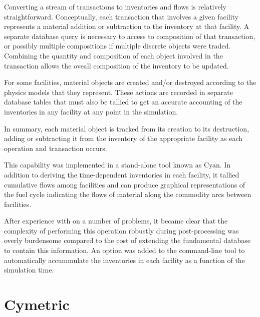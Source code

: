 Converting a stream of transactions to inventories and flows is relatively
straightforward.  Conceptually, each transaction that involves a given
facility represents a material addition or subtraction to the inventory at
that facility.  A separate database query is necessary to access to
composition of that transaction, or possibly multiple compositions if multiple
discrete objects were traded.  Combining the quantity and composition of each
object involved in the transaction allows the oveall composition of the
inventory to be updated.

For some facilities, material objects are created and/or destroyed according
to the physics models that they represent.  These actions are recorded in
separate database tables that must also be tallied to get an accurate
accounting of the inventories in any facility at any point in the simulation.

In summary, each material object is tracked from its creation to its
destruction, adding or subtracting it from the inventory of the appropriate
facility as each operation and transaction occurs.

This capability was implemented in a stand-alone tool known as Cyan.  In
addition to deriving the time-dependent inventories in each facility, it
tallied cumulative flows among facilities and can produce graphical
representations of the fuel cycle indicating the flows of material along the
commodity arcs between facilities.

After experience with \Cyclus on a number of problems, it became clear that
the complexity of performing this operation robustly during post-processing
was overly burdensome compared to the cost of extending the fundamental
\Cyclus database to contain this information.  An option was added to the
\Cyclus command-line tool to automatically accummulate the inventories in each
facility as a function of the simulation time.

\section{Cymetric}

